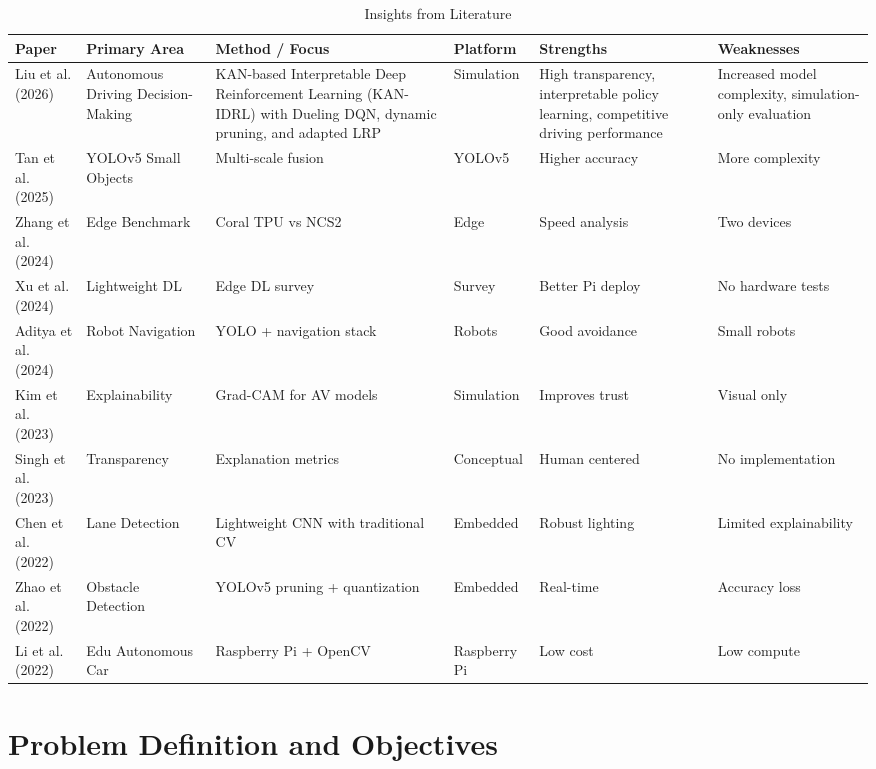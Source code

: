 \documentclass[conference]{IEEEtran}
\begin{document}
\begin{table}[t]
\centering
\footnotesize
\setlength{\tabcolsep}{3pt}
\renewcommand{\arraystretch}{1.15}

\begin{tabularx}{\textwidth}{|p{2cm}|p{2cm}|X|p{1.5cm}|p{2cm}|p{2cm}|}
\hline
\textbf{Paper} & \textbf{Primary Area} & \textbf{Method / Focus} & \textbf{Platform} & \textbf{Strengths} & \textbf{Weaknesses} \\
\hline
Liu et al. (2026) & Autonomous Driving Decision-Making & KAN-based Interpretable Deep Reinforcement Learning (KAN-IDRL) with Dueling DQN, dynamic pruning, and adapted LRP & Simulation & High transparency, interpretable policy learning, competitive driving performance & Increased model complexity, simulation-only evaluation \\
\hline
Tan et al. (2025) & YOLOv5 Small Objects & Multi-scale fusion & YOLOv5 & Higher accuracy & More complexity \\
\hline
Zhang et al. (2024) & Edge Benchmark & Coral TPU vs NCS2 & Edge & Speed analysis & Two devices \\
\hline
Xu et al. (2024) & Lightweight DL & Edge DL survey & Survey & Better Pi deploy & No hardware tests \\
\hline
Aditya et al. (2024) & Robot Navigation & YOLO + navigation stack & Robots & Good avoidance & Small robots \\
\hline
Kim et al. (2023) & Explainability & Grad-CAM for AV models & Simulation & Improves trust & Visual only \\
\hline
Singh et al. (2023) & Transparency & Explanation metrics & Conceptual & Human centered & No implementation \\
\hline
Chen et al. (2022) & Lane Detection & Lightweight CNN with traditional CV & Embedded & Robust lighting & Limited explainability \\
\hline
Zhao et al. (2022) & Obstacle Detection & YOLOv5 pruning + quantization & Embedded & Real-time & Accuracy loss \\
\hline
Li et al. (2022) & Edu Autonomous Car & Raspberry Pi + OpenCV & Raspberry Pi & Low cost & Low compute \\
\hline
\end{tabularx}
\vspace{2mm}
\caption{Insights from Literature}
\end{table}

\FloatBarrier

\section{Problem Definition and Objectives}
\end{document}
